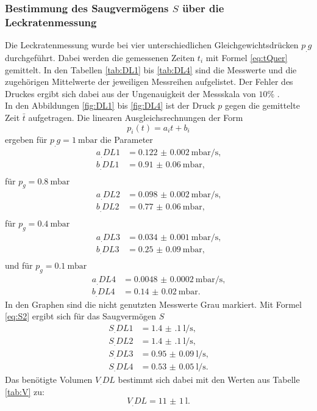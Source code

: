 \subsubsection{Bestimmung des Saugvermögens $S$ über die Leckratenmessung}

Die Leckratenmessung wurde bei vier unterschiedlichen Gleichgewichtsdrücken $p_.g$ durchgeführt. Dabei werden die gemessenen Zeiten $t_i$ mit Formel \eqref{eq:tQuer} gemittelt.
In den Tabellen \ref{tab:DL1} bis \ref{tab:DL4} sind die Messwerte und die zugehörigen Mittelwerte der jeweiligen Messreihen aufgelistet. Der Fehler des Druckes ergibt sich dabei aus der Ungenauigkeit der Messskala von $10\%$ \cite{V70}.\\
In den Abbildungen \ref{fig:DL1} bis \ref{fig:DL4} ist der Druck $p$ gegen die gemittelte Zeit $\bar{t}$ aufgetragen.
Die linearen Ausgleichsrechnungen der Form
\[
p_i(t) = a_it+b_i
\]
ergeben für $p_.g = \SI{1}{\milli\bar}$ die Parameter
\begin{align*}
a_.{DL1} &= \SI{0.122(2)}{\milli\bar\per\second} \text{,}\\
b_.{DL1} &= \SI{0.91(6)}{\milli\bar} \text{,}\\
\end{align*}
für $p_g = \SI{0.8}{\milli\bar}$
\begin{align*}
a_.{DL2} &= \SI{0.098(2)}{\milli\bar\per\second} \text{,}\\
b_.{DL2} &= \SI{0.77(6)}{\milli\bar} \text{,}\\
\end{align*}
für $p_g = \SI{0.4}{\milli\bar}$
\begin{align*}
a_.{DL3} &= \SI{0.034(1)}{\milli\bar\per\second} \text{,}\\
b_.{DL3} &= \SI{0.25(9)}{\milli\bar} \text{,}\\
\end{align*}
und für $p_g = \SI{0.1}{\milli\bar}$
\begin{align*}
a_.{DL4} &= \SI{0.0048(2)}{\milli\bar\per\second} \text{,}\\
b_.{DL4} &= \SI{0.14(2)}{\milli\bar} \text{.}
\end{align*}
In den Graphen sind die nicht genutzten Messwerte Grau markiert.
Mit Formel \eqref{eq:S2} ergibt sich für das Saugvermögen $S$
\begin{align*}
S_.{DL1} &= \SI{1.4(1)}{\litre\per\second} \text{,}\\
S_.{DL2} &= \SI{1.4(1)}{\litre\per\second} \text{,}\\
S_.{DL3} &= \SI{0.95(9)}{\litre\per\second} \text{,}\\
S_.{DL4}   &= \SI{0.53(5)}{\litre\per\second} \text{.}
\end{align*}
Das benötigte Volumen $V_.{DL}$ bestimmt sich dabei mit den Werten aus Tabelle \ref{tab:V} zu:
\[
V_.{DL} = \SI{11(1)}{\litre}\text{.}
\]



